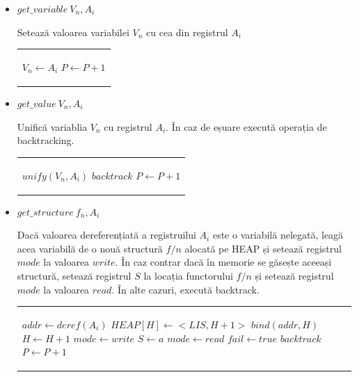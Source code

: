 \documentclass[12pt,a4paper,twoside]{report}
\begin{document}
\begin{itemize}
	\item \(get\_variable\  V_n, A_i\) \\
	\begin{minipage}{0.45\textwidth}
		   Setează valoarea variabilei $V_n$ cu cea din registrul $A_i$
	\end{minipage}%
	\hfill
	\begin{minipage}{0.45\textwidth}
	\begin{tabular}{|p{\textwidth}}
	\begin{algorithmic}
		\State $V_n \leftarrow A_i $
		\State $P \leftarrow P + 1$
	\end{algorithmic}
	\end{tabular}
	\end{minipage}%
	
	\item \(get\_value\  V_n, A_i\) \\
	\begin{minipage}{0.45\textwidth}
		   Unifică variablia $V_n$ cu registrul $A_i$. În caz de eșuare execută operația de backtracking.
	\end{minipage}%
	\hfill
	\begin{minipage}{0.45\textwidth}
	\begin{tabular}{|p{\textwidth}}
	\begin{algorithmic}
		\State $unify(V_n, A_i)$
		\If{$fail$}
			\State $backtrack$
		\Else
			\State $P \leftarrow P + 1$
		\EndIf
	\end{algorithmic}
	\end{tabular}
	\end{minipage}%
	
	\item \(get\_structure\  f_n, A_i\) \\
	\begin{minipage}{0.45\textwidth}
		  Dacă valoarea dereferențiată a registruilui $A_i$ este o variabilă nelegată, leagă acea variabilă de o nouă structură $f/n$ alocată pe HEAP și setează registrul $mode$ la valoarea $write$. În caz contrar dacă în memorie se găsește aceeași structură, setează registrul $S$ la locația functorului $f/n$ și setează registrul $mode$ la valoarea $read$. În alte cazuri, execută backtrack.
	\end{minipage}%
	\hfill
	\begin{minipage}{0.45\textwidth}
	\begin{tabular}{|p{\textwidth}}
	\begin{algorithmic}
		\State $addr \leftarrow deref(A_i)$
		\Switch{$STORE[addr]$}
			\Case{$<REF, \_>$}
				\State $HEAP[H] \leftarrow <LIS, H+1>$
				\State $bind(addr, H)$
				\State $H \leftarrow H + 1$
				\State $mode \leftarrow write$
			\EndCase	
			\Case{$<LIS, a>$}
				\State $S \leftarrow a$
				\State $mode \leftarrow read$
			\EndCase
			\Case{$other$}
				\State $fail \leftarrow true$
			\EndCase
		\EndSwitch
		\If{$fail$}
			\State $backtrack$
		\Else
			\State $P \gets P + 1$
		\EndIf		
	\end{algorithmic}
	\end{tabular}
	\end{minipage}%
\end{itemize}
\end{document}
